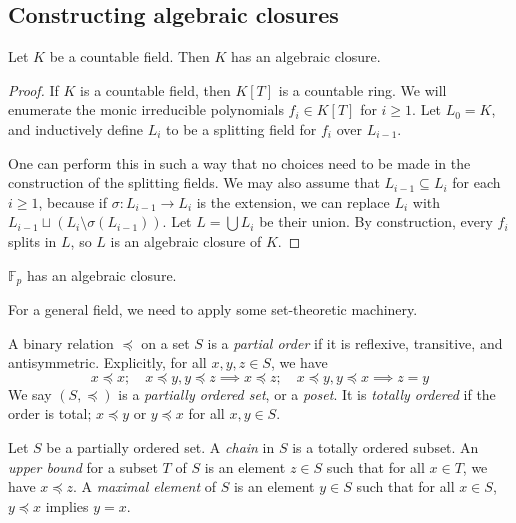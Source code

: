 \subsection{Constructing algebraic closures}
\begin{proposition}
	Let \( K \) be a countable field.
	Then \( K \) has an algebraic closure.
\end{proposition}
\begin{proof}
	If \( K \) is a countable field, then \( K[T] \) is a countable ring.
	We will enumerate the monic irreducible polynomials \( f_i \in K[T] \) for \( i \geq 1 \).
	Let \( L_0 = K \), and inductively define \( L_i \) to be a splitting field for \( f_i \) over \( L_{i-1} \).

	One can perform this in such a way that no choices need to be made in the construction of the splitting fields.
	We may also assume that \( L_{i-1} \subseteq L_i \) for each \( i \geq 1 \), because if \( \sigma \colon L_{i-1} \to L_i \) is the extension, we can replace \( L_i \) with \( L_{i-1} \sqcup (L_i \setminus \sigma(L_{i-1})) \).
	Let \( L = \bigcup L_i \) be their union.
	By construction, every \( f_i \) splits in \( L \), so \( L \) is an algebraic closure of \( K \).
\end{proof}
\begin{example}
	\( \mathbb F_p \) has an algebraic closure.
\end{example}
For a general field, we need to apply some set-theoretic machinery.
\begin{definition}
	A binary relation \( \preceq \) on a set \( S \) is a \emph{partial order} if it is reflexive, transitive, and antisymmetric.
	Explicitly, for all \( x, y, z \in S \), we have
	\[ x \preceq x;\quad x \preceq y, y \preceq z \implies x \preceq z;\quad x \preceq y, y \preceq x \implies z = y \]
	We say \( (S, \preceq) \) is a \emph{partially ordered set}, or a \emph{poset}.
	It is \emph{totally ordered} if the order is total; \( x \preceq y \) or \( y \preceq x \) for all \( x, y \in S \).
\end{definition}
\begin{definition}
	Let \( S \) be a partially ordered set.
	A \emph{chain} in \( S \) is a totally ordered subset.
	An \emph{upper bound} for a subset \( T \) of \( S \) is an element \( z \in S \) such that for all \( x \in T \), we have \( x \preceq z \).
	A \emph{maximal element} of \( S \) is an element \( y \in S \) such that for all \( x \in S \), \( y \preceq x \) implies \( y = x \).
\end{definition}
